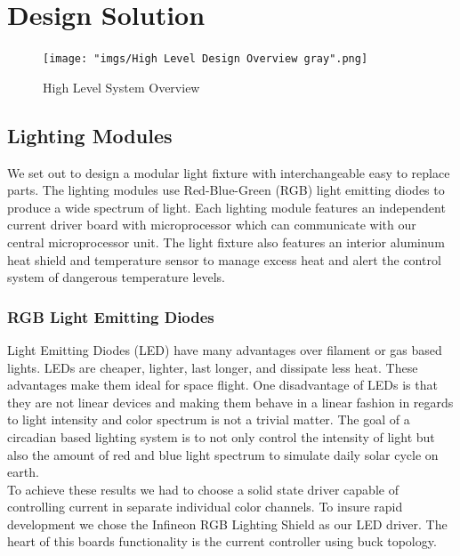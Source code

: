 \documentclass[12pt,a4paper]{report}
\begin{document}
\section{Design Solution}

\begin{figure}[H]
	\centering
	\texttt{[image: "imgs/High Level Design Overview gray".png]}\par			\vspace{0.1cm}
	\caption{High Level System Overview}
\end{figure}
\subsection{Lighting Modules}
We set out to design a modular light fixture with interchangeable easy to replace parts. The lighting modules use Red-Blue-Green (RGB) light emitting diodes to produce a wide spectrum of light. Each lighting module features an independent current driver board with microprocessor which can communicate with our central microprocessor unit. The light fixture also features an interior aluminum heat shield and temperature sensor to manage excess heat and alert the control system of dangerous temperature levels. 
 
\subsubsection{RGB Light Emitting Diodes}
Light Emitting Diodes (LED) have many advantages over filament or gas based lights. LEDs are cheaper, lighter, last longer, and dissipate less heat. These advantages make them ideal for space flight. One disadvantage of LEDs is that they are not linear devices and making them behave in a linear fashion in regards to light intensity and color spectrum is not a trivial matter. The goal of a circadian based lighting system is to not only control the intensity of light but also the amount of red and blue light spectrum to simulate daily solar cycle on earth. \\ \linebreak 
To achieve these results we had to choose a solid state driver capable of controlling current in separate individual color channels. To insure rapid development we chose the Infineon RGB Lighting Shield as our LED driver. The heart of this boards functionality is the current controller using buck topology. 
\end{document}
